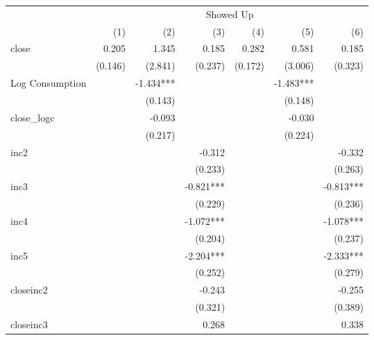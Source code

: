 \begin{tabular}{lrrrrrr}
\toprule
                      &                   \multicolumn{6}{c}{Showed Up}                   \\ 
\cmidrule(lr){2-7} 
                      &     (1) &       (2) &       (3) &     (4) &       (5) &       (6) \\ 
\midrule
close                 &   0.205 &     1.345 &     0.185 &   0.282 &     0.581 &     0.185 \\ 
                      & (0.146) &   (2.841) &   (0.237) & (0.172) &   (3.006) &   (0.323) \\ 
Log Consumption       &         & -1.434*** &           &         & -1.483*** &           \\ 
                      &         &   (0.143) &           &         &   (0.148) &           \\ 
close_logc            &         &    -0.093 &           &         &    -0.030 &           \\ 
                      &         &   (0.217) &           &         &   (0.224) &           \\ 
inc2                  &         &           &    -0.312 &         &           &    -0.332 \\ 
                      &         &           &   (0.233) &         &           &   (0.263) \\ 
inc3                  &         &           & -0.821*** &         &           & -0.813*** \\ 
                      &         &           &   (0.229) &         &           &   (0.236) \\ 
inc4                  &         &           & -1.072*** &         &           & -1.078*** \\ 
                      &         &           &   (0.204) &         &           &   (0.237) \\ 
inc5                  &         &           & -2.204*** &         &           & -2.333*** \\ 
                      &         &           &   (0.252) &         &           &   (0.279) \\ 
closeinc2             &         &           &    -0.243 &         &           &    -0.255 \\ 
                      &         &           &   (0.321) &         &           &   (0.389) \\ 
closeinc3             &         &           &     0.268 &         &           &     0.338 \\ 

\end{tabular}
